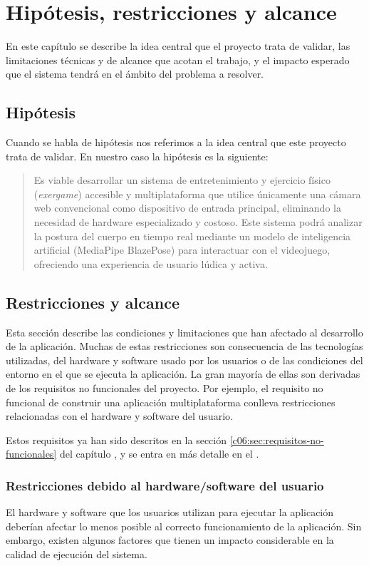 \chapter{Hipótesis, restricciones y alcance}
\label{cap:hipotesis}
En este capítulo se describe la idea central que el proyecto trata de validar, las limitaciones
técnicas y de alcance que acotan el trabajo, y el impacto esperado que el sistema tendrá en el
ámbito del problema a resolver.

\section{Hipótesis}
\label{sec:hipotesis}
Cuando se habla de hipótesis nos referimos a la idea central que este proyecto trata de validar.
En nuestro caso la hipótesis es la siguiente:
\begin{quote}
    Es viable desarrollar un sistema de entretenimiento y ejercicio físico (\textit{\gls{exergame}})
    accesible y multiplataforma que utilice únicamente una cámara web convencional como dispositivo
    de entrada principal, eliminando la necesidad de hardware especializado y costoso. Este sistema
    podrá analizar la postura del cuerpo en tiempo real mediante un modelo de inteligencia
    artificial (MediaPipe BlazePose) para interactuar con el videojuego, ofreciendo una experiencia
    de usuario lúdica y activa.
\end{quote}

\section{Restricciones y alcance}
\label{sec:restricciones}
Esta sección describe las condiciones y limitaciones que han afectado al
desarrollo de la aplicación.  Muchas de estas restricciones son consecuencia de
las tecnologías utilizadas, del hardware y software usado por los usuarios o de
las condiciones del entorno en el que se ejecuta la aplicación. La gran mayoría
de ellas son derivadas de los requisitos no funcionales del proyecto. Por
ejemplo, el requisito no funcional de construir una aplicación multiplataforma
conlleva restricciones relacionadas con el hardware y software del usuario.

Estos requisitos ya han sido descritos en la sección
\ref{c06:sec:requisitos-no-funcionales} del capítulo , y
se entra en más detalle en el \primerAnexo.

\subsection{Restricciones debido al hardware/software del usuario}
El hardware y software que los usuarios utilizan para ejecutar la aplicación deberían afectar lo
menos posible al correcto funcionamiento de la aplicación. Sin embargo, existen algunos factores
que tienen un impacto considerable en la calidad de ejecución del sistema.

